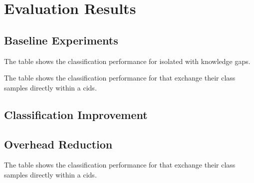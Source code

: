 \documentclass[../../main.tex]{subfiles}
\begin{document}
\section{Evaluation Results}

\subsection{Baseline Experiments}

\begin{table}[H]
    \footnotesize
    \centering
    \setlength{\extrarowheight}{0pt}
    \addtolength{\extrarowheight}{\aboverulesep}
    \addtolength{\extrarowheight}{\belowrulesep}
    \addtolength{\tabcolsep}{-0.4em}
    \setlength{\aboverulesep}{0pt}
    \setlength{\belowrulesep}{0pt}
    \setlength{\extrarowheight}{.1em}
     
    \caption[Baseline Detection Performance With Missing Class Information]{The table shows the classification performance for isolated  with knowledge gaps.}
    \label{tab:missing_classes}
\end{table}

\begin{table}[H]
    \footnotesize
    \centering
    \setlength{\extrarowheight}{0pt}
    \addtolength{\extrarowheight}{\aboverulesep}
    \addtolength{\extrarowheight}{\belowrulesep}
    \addtolength{\tabcolsep}{-0.4em}
    \setlength{\aboverulesep}{0pt}
    \setlength{\belowrulesep}{0pt}
    \setlength{\extrarowheight}{.1em}
     
    \caption[Baseline Detection Performance With Class Information from Other Datasets]{The table shows the classification performance for  that exchange their class samples directly within a \gls{cids}.}
    \label{tab:baseline_detection}
\end{table}

\subsection{Classification Improvement}

\subsection{Overhead Reduction}
    \begin{table}[H]
        \footnotesize
        \centering
        \setlength{\extrarowheight}{0pt}
        \addtolength{\extrarowheight}{\aboverulesep}
        \addtolength{\extrarowheight}{\belowrulesep}
        \addtolength{\tabcolsep}{-0.4em}
        \setlength{\aboverulesep}{0pt}
        \setlength{\belowrulesep}{0pt}
        \setlength{\extrarowheight}{.1em}
         
        \caption[Parameter Number Analysis]{The table shows the classification performance for  that exchange their class samples directly within a \gls{cids}.}
        \label{tab:region_analysis}
    \end{table}

\end{document}
